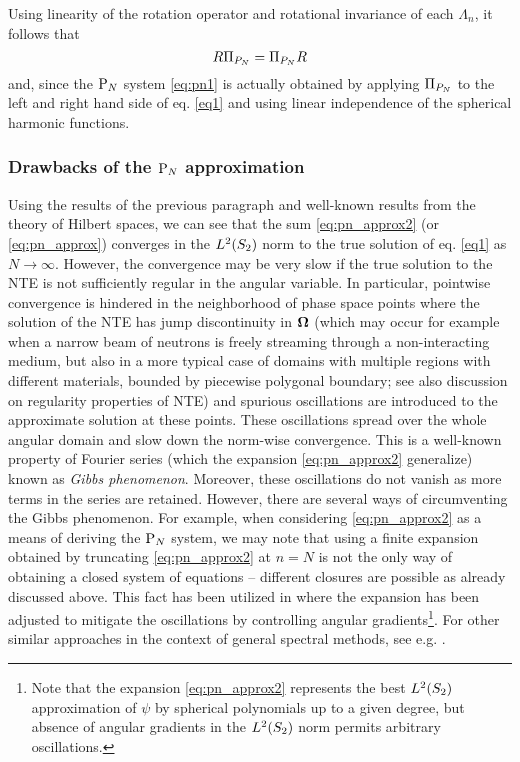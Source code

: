Using linearity of the rotation operator and rotational
invariance of each $\Lambda_n$, it follows that 
$$
	\op{R}\PiPN = \PiPN\op{R}
$$
and, since the $\PN$ system \eqref{eq:pn1} is actually obtained by applying $\PiPN$ to the left and right
hand side of eq. \eqref{eq1} and using linear independence of the spherical harmonic functions. 

\subsubsection{Drawbacks of the $\PN$ approximation}
Using the results of the previous paragraph and well-known results from the theory of Hilbert spaces, we can see that
the sum \eqref{eq:pn_approx2} (or \eqref{eq:pn_approx}) converges in the $\Lp[2](\Sphere)$ norm to the true solution of
eq. \eqref{eq1} as $N\to\infty$. However, the convergence may be very slow if the true solution to the NTE is not
sufficiently regular in the angular variable. In particular, pointwise convergence is hindered in the neighborhood of
phase space points where the solution of the NTE has jump discontinuity in $\bomega$ (which may occur for example when a
narrow beam of neutrons is freely streaming through a non-interacting medium, but also in a more typical case of domains
with multiple regions with different materials, bounded by piecewise polygonal boundary; see also \alert{discussion on
regularity properties of NTE}) and spurious oscillations are introduced to the approximate solution at these points.
These oscillations spread over the whole angular domain and slow down the norm-wise convergence. This is a well-known
property of Fourier series (which the expansion \eqref{eq:pn_approx2} generalize) known as \textit{Gibbs phenomenon}.
Moreover, these oscillations do not vanish as more terms in the series are retained. However, there are several ways of
circumventing the Gibbs phenomenon. For example, when considering \eqref{eq:pn_approx2} as a means of deriving the $\PN$
system, we may note that using a finite expansion obtained by truncating \eqref{eq:pn_approx2} at $n=N$ is not the only
way of obtaining a closed system of equations -- different closures are possible as already discussed above. This fact
has been utilized in \cite{McClarren3} where the expansion has been adjusted to mitigate the oscillations by controlling
angular gradients\footnote{Note that the expansion \eqref{eq:pn_approx2} represents the best $\Lp[2](\Sphere)$
approximation of $\psi$ by spherical polynomials up to a given degree, but absence of angular gradients in the
$\Lp[2](\Sphere)$ norm permits arbitrary oscillations.}. For other similar approaches in the context of general spectral
methods, see e.g. \cite{Tanner}.

